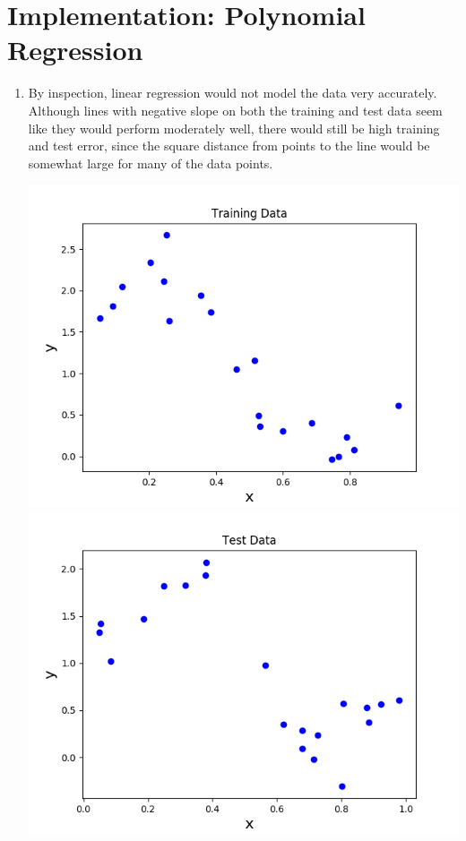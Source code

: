 \documentclass[11pt]{article}
\begin{document}
\section{Implementation: Polynomial Regression}
\begin{enumerate}
\item %
By inspection, linear regression would not model the data very accurately. Although lines with negative slope on both the training and test data seem like they would perform moderately well, there would still be high training and test error, since the square distance from points to the line would be somewhat large for many of the data points. 


\includegraphics[width=\linewidth]{Training_Data.png}
\includegraphics[width=\linewidth]{Test_Data.png}


\end{enumerate}
\end{document}
